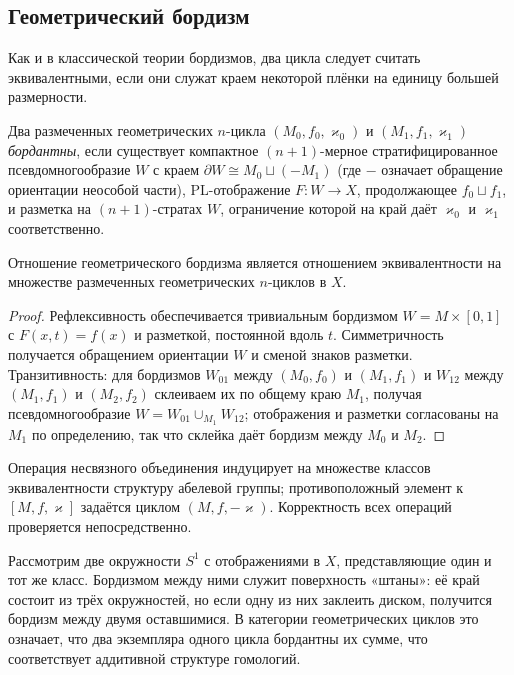 \documentclass[12pt]{article}
\begin{document}
\subsection{Геометрический бордизм}

Как и в классической теории бордизмов, два цикла следует считать эквивалентными, если они служат краем некоторой плёнки на единицу большей размерности.

\begin{definition}\label{def:bordism}
Два размеченных геометрических $n$-цикла $(M_0,f_0,\varkappa_0)$ и $(M_1,f_1,\varkappa_1)$ \emph{бордантны}, если существует компактное $(n+1)$-мерное стратифицированное псевдомногообразие $W$ с краем $\partial W \cong M_0 \sqcup (-M_1)$ (где $-$ означает обращение ориентации неособой части), PL-отображение $F: W \to X$, продолжающее $f_0 \sqcup f_1$, и разметка на $(n+1)$-стратах $W$, ограничение которой на край даёт $\varkappa_0$ и $\varkappa_1$ соответственно.
\end{definition}

\begin{lemma}
Отношение геометрического бордизма является отношением эквивалентности на множестве размеченных геометрических $n$-циклов в $X$.
\end{lemma}
\begin{proof}
Рефлексивность обеспечивается тривиальным бордизмом $W = M \times [0,1]$ с $F(x,t) = f(x)$ и разметкой, постоянной вдоль $t$. Симметричность получается обращением ориентации $W$ и сменой знаков разметки. Транзитивность: для бордизмов $W_{01}$ между $(M_0,f_0)$ и $(M_1,f_1)$ и $W_{12}$ между $(M_1,f_1)$ и $(M_2,f_2)$ склеиваем их по общему краю $M_1$, получая псевдомногообразие $W = W_{01} \cup_{M_1} W_{12}$; отображения и разметки согласованы на $M_1$ по определению, так что склейка даёт бордизм между $M_0$ и $M_2$.
\end{proof}

Операция несвязного объединения индуцирует на множестве классов эквивалентности структуру абелевой группы; противоположный элемент к $[M,f,\varkappa]$ задаётся циклом $(M,f,-\varkappa)$. Корректность всех операций проверяется непосредственно.

\begin{example}
Рассмотрим две окружности $S^1$ с отображениями в $X$, представляющие один и тот же класс. Бордизмом между ними служит поверхность «штаны»: её край состоит из трёх окружностей, но если одну из них заклеить диском, получится бордизм между двумя оставшимися. В категории геометрических циклов это означает, что два экземпляра одного цикла бордантны их сумме, что соответствует аддитивной структуре гомологий.
\end{example}
\end{document}
